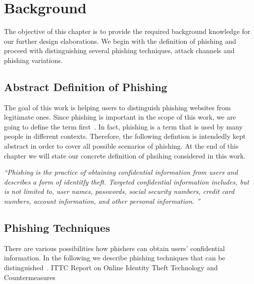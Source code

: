 \section{Background}
\label{s:background}
The objective of this chapter is to provide the required background knowledge for our further design elaborations.
 We begin with the definition of phishing and proceed with distinguishing several phishing techniques, attack channels and phishing variations.

\subsection{Abstract Definition of Phishing}
\label{s:phishing_def}
The goal of this work is helping users to distinguish phishing websites from legitimate ones. 
 Since phishing is important in the scope of this work, we are going to define the term first~\cite{jakobsson2006phishing}. In fact, phishing is a term that is used by many people in different contexts. Therefore, the following defintion is intendedly kept abstract in order to cover all possible scenarios of phishing. At the end of this chapter we will state our concrete definition of phsihing considered in this work.

\begin{center}
\textit{``Phishing is the practice of obtaining confidential information from users and describes a form of identitfy theft.
 Targeted confidential information includes, but is not limited to, user names, passwords, social security numbers, credit card numbers, account information, and other personal information.
''}
\end{center}

\subsection{Phishing Techniques}
\label{s:phishing_techs}
There are various possibilities how phishers can obtain users' confidential information.
 In the following we describe phishing techniques that can be distinguished~\cite{jakobsson2006phishing}.
 ITTC Report on Online Identity Theft Technology and Countermeasures

